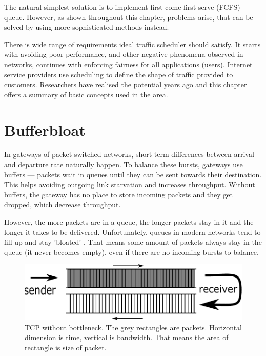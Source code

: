 The natural simplest solution is to implement first-come first-serve (FCFS) queue. However, as shown throughout this chapter, problems arise, that can be solved by using more sophisticated methods instead.

There is wide range of requirements ideal traffic scheduler should satisfy. It starts with avoiding poor performance, and other negative phenomena observed in networks, continues with enforcing fairness for all applications (users). Internet service providers use scheduling to define the shape of traffic provided to customers. Researchers have realised the potential years ago and this chapter offers a summary of basic concepts used in the area.







\section{Bufferbloat}
\label{chap:bb}

In gateways of packet-switched networks, short-term differences between arrival and departure rate naturally happen. To balance these bursts, gateways use buffers --- packets wait in queues until they can be sent towards their destination. This helps avoiding outgoing link starvation and increases throughput. Without buffers, the gateway has no place to store incoming packets and they get dropped, which decrease throughput.


However, the more packets are in a queue, the longer packets stay in it and the longer it takes to be delivered. Unfortunately, queues in modern networks tend to fill up and stay 'bloated' \cite{Gettys:2012:BDB:2063176.2063196}. That means some amount of packets always stay in the queue (it never becomes empty), even if there are no incoming bursts to balance.

\begin{figure}
	\centering
	\includegraphics[width=137mm]{drawings/tcp_no_bottleneck}
	\caption{TCP without bottleneck. The grey rectangles are packets. Horizontal dimension is time, vertical is bandwidth. That means the area of rectangle is size of packet.}
	\label{fig01:no_bottle}
\end{figure}

